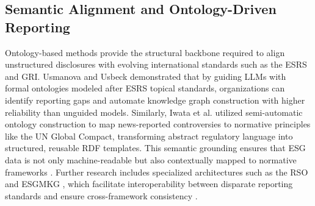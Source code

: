 \subsection{Semantic Alignment and Ontology-Driven Reporting}

Ontology-based methods provide the structural backbone required to align unstructured disclosures with evolving international standards such as the ESRS and GRI. Usmanova and Usbeck  \parencite{aida_usmanova_e9b44e1d} demonstrated that by guiding LLMs with formal ontologies modeled after ESRS topical standards, organizations can identify reporting gaps and automate knowledge graph construction with higher reliability than unguided models. Similarly, Iwata et al.  \parencite{tsuyoshi_iwata_18ccc0b8} utilized semi-automatic ontology construction to map news-reported controversies to normative principles like the UN Global Compact, transforming abstract regulatory language into structured, reusable RDF templates. This semantic grounding ensures that ESG data is not only machine-readable but also contextually mapped to normative frameworks  \parencite{tsuyoshi_iwata_18ccc0b8}. Further research includes specialized architectures such as the RSO  \parencite{yuchen_zhou_b6beee03} and ESGMKG  \parencite{mingqin_yu_96a5b8af}, which facilitate interoperability between disparate reporting standards and ensure cross-framework consistency  \parencite{annas_vijaya_dc57c7ec}.


